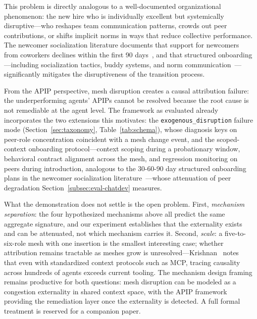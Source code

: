 \documentclass[conference]{IEEEtran}
\begin{document}
This problem is directly analogous to a well-documented organizational
phenomenon: the new hire who is individually excellent but systemically
disruptive---who reshapes team communication patterns, crowds out peer
contributions, or shifts implicit norms in ways that reduce collective
performance. The newcomer socialization literature documents that support for
newcomers from coworkers declines within the first 90
days~\cite{kammeyer2013support}, and that structured onboarding---including
socialization tactics, buddy systems, and norm
communication~\cite{bauer2025newcomer,trainer2020membership}---significantly
mitigates the disruptiveness of the transition process.

From the APIP perspective, mesh disruption creates a causal attribution
failure: the underperforming agents' APIPs cannot be resolved because the root
cause is not remediable at the agent level. The framework as evaluated already
incorporates the two extensions this motivates: the
\texttt{exogenous\_disruption} failure mode
(Section~\ref{sec:taxonomy}, Table~\ref{tab:schema}), whose diagnosis keys on
peer-role concentration coincident with a mesh change event, and the
scoped-context onboarding protocol---context scoping during a probationary
window, behavioral contract alignment across the mesh, and regression
monitoring on peers during introduction, analogous to the 30-60-90 day
structured onboarding plans in the newcomer socialization
literature~\cite{bauer2025newcomer,kammeyer2013support}---whose attenuation of
peer degradation Section~\ref{subsec:eval-chatdev} measures.

What the demonstration does not settle is the open problem. First,
\emph{mechanism separation}: the four hypothesized mechanisms above all
predict the same aggregate signature, and our experiment establishes that the
externality exists and can be attenuated, not which mechanism carries it.
Second, \emph{scale}: a five-to-six-role mesh with one insertion is the
smallest interesting case; whether attribution remains tractable as meshes
grow is unresolved---Krishnan~\cite{krishnan2025mcp} notes that even with
standardized context protocols such as MCP, tracing causality across hundreds
of agents exceeds current tooling. The mechanism design framing remains
productive for both questions: mesh disruption can be modeled as a congestion
externality in shared context space, with the APIP framework providing the
remediation layer once the externality is detected. A full formal treatment is
reserved for a companion paper.
\end{document}
